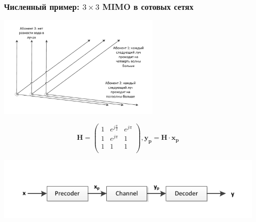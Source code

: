 \documentclass[utf8]{beamer}
\begin{document}
\begin{frame}
\frametitle{Численный пример: $3\times3$ MIMO  в сотовых сетях}
\begin{center}
\includegraphics[width=0.6\textwidth]{pic/MIMO-example.pdf}
\end{center}
$$
\mathbf{H} =
\left(
\begin{array}{ccc}
1 & e^{j\frac{\pi}{2}} & e^{j\pi}\\
1 & e^{j\pi}           & 1       \\
1 &  1                 & 1       \\
\end{array}
\right),
\mathbf{y_p} = \mathbf{H}\cdot \mathbf{x_p}
$$
\begin{center}
\includegraphics[width=\textwidth]{pic/MIMO-precoder.pdf}
\end{center}
\end{frame}
\end{document}
